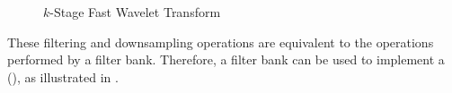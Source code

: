 \begin{figure}[h] %
\centering\gsize
\caption{
   $k$-Stage Fast Wavelet Transform
   \label{fig:fwt}
   }
\end{figure}
These filtering and downsampling operations are equivalent to the 
operations performed by a filter bank.  
Therefore, a filter bank can be 
used to implement a  (), 
as illustrated in .



